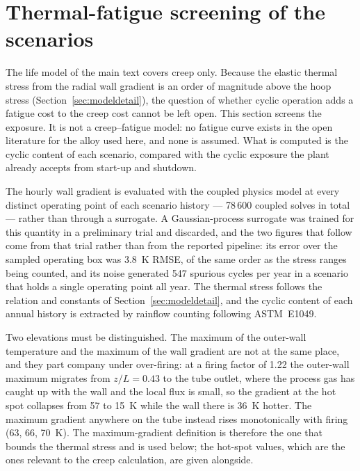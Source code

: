\documentclass[final,3p,times]{elsarticle}
\begin{document}
\section{Thermal-fatigue screening of the scenarios}
\label{sec:fatigue}

The life model of the main text covers creep only. Because the elastic thermal stress from
the radial wall gradient is an order of magnitude above the hoop stress
(Section~\ref{sec:modeldetail}), the question of whether cyclic operation adds a fatigue
cost to the creep cost cannot be left open. This section screens the exposure. It is not a
creep--fatigue model: no fatigue curve exists in the open literature for the alloy used
here, and none is assumed. What is computed is the cyclic content of each scenario,
compared with the cyclic exposure the plant already accepts from start-up and shutdown.

The hourly wall gradient is evaluated with the coupled physics model at every distinct
operating point of each scenario history --- 78\,600 coupled solves in total --- rather
than through a surrogate. A Gaussian-process surrogate was trained for this quantity in a
preliminary trial and discarded, and the two figures that follow come from that trial
rather than from the reported pipeline: its error over the sampled operating box was
3.8~K RMSE, of the same order as the stress ranges being counted, and its noise generated
547 spurious cycles per year in a scenario that holds a single operating point all year.
The thermal stress follows the relation and constants of Section~\ref{sec:modeldetail},
and the cyclic content of each annual history is extracted by rainflow counting following
ASTM~E1049.

Two elevations must be distinguished. The maximum of the outer-wall temperature and the
maximum of the wall gradient are not at the same place, and they part company under
over-firing: at a firing factor of 1.22 the outer-wall maximum migrates from
$z/L = 0.43$ to the tube outlet, where the process gas has caught up with the wall and the
local flux is small, so the gradient at the hot spot collapses from 57 to 15~K while the
wall there is 36~K hotter. The maximum gradient anywhere on the tube instead rises
monotonically with firing (63, 66, 70~K). The maximum-gradient definition is therefore the
one that bounds the thermal stress and is used below; the hot-spot values, which are the
ones relevant to the creep calculation, are given alongside.
\end{document}
